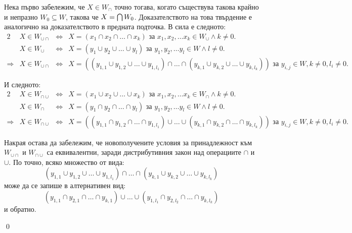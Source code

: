 \begin{problem}
\begin{enumerate}
\smallbreak
\quad
Нека първо забележим, че $X \in W_{\cap}$ точно тогава, когато съществува такова крайно и непразно $W_0 \subseteq W$, такова че $X = \bigcap{W_0}$.
Доказателството на това твърдение е аналогично на доказателството в предната подточка. В сила е следното:
\begin{alignat*}{2}
&X \in W_{\cup \cap} & \iff & X = (x_1 \cap x_2 \cap \dots \cap x_k) \text{ за } x_1, x_2, \dots x_k \in W_{\cup} \land k \neq 0. \\
&X \in W_{\cup}      & \iff & X = (y_1 \cup y_2 \cup \dots \cup y_l) \text{ за } y_1, y_2, \dots y_l \in W \land l \neq 0. \\
\hline
\Rightarrow {} &X \in W_{\cup \cap} & \iff & X = ((y_{1,1} \cup y_{1,2} \cup \dots \cup y_{1,l_1}) \cap \dots \cap (y_{k,1} \cup y_{k,2} \cup \dots \cup y_{k,l_k}))
\text{ за } y_{i, j} \in W, k \neq 0, l_i \neq 0.
\end{alignat*}

И следното:
\begin{alignat*}{2}
&X \in W_{\cap \cup} & \iff & X = (x_1 \cup x_2 \cup \dots \cup x_k) \text{ за } x_1, x_2, \dots x_k \in W_{\cap} \land k \neq 0. \\
&X \in W_{\cap}      & \iff & X = (y_1 \cap y_2 \cap \dots \cap y_l) \text{ за } y_1, y_2, \dots y_l \in W \land l \neq 0. \\
\hline
\Rightarrow {} &X \in W_{\cap \cup} & \iff & X = ((y_{1,1} \cap y_{1,2} \cap \dots \cap y_{1,l_1}) \cup \dots \cup (y_{k,1} \cap y_{k,2} \cap \dots \cap y_{k,l_k}))
\text{ за } y_{i,j} \in W, k \neq 0, l_i \neq 0.
\end{alignat*}

\quad
Накрая остава да забележим, че новополучените условия за принадлежност към $W_{\cup \cap}$ и $W_{\cap \cup}$ са еквивалентни,
заради дистрибутивния закон над операциите $\cap$ и $\cup$. По точно, всяко множество от вида:
\[
(y_{1,1} \cup y_{1,2} \cup \dots \cup y_{1,l_1}) \cap \dots \cap (y_{k,1} \cup y_{k,2} \cup \dots \cup y_{k,l_k})
\]
може да се запише в алтернативен вид:
\[
(y_{1,1} \cap y_{2,1} \cap \dots \cap y_{k,1}) \cup \dots \cup (y_{1,l_1} \cap y_{2,l_2} \cap \dots \cap y_{k,l_k})
\]
и обратно.

\qed

\end{enumerate}
\end{problem}
